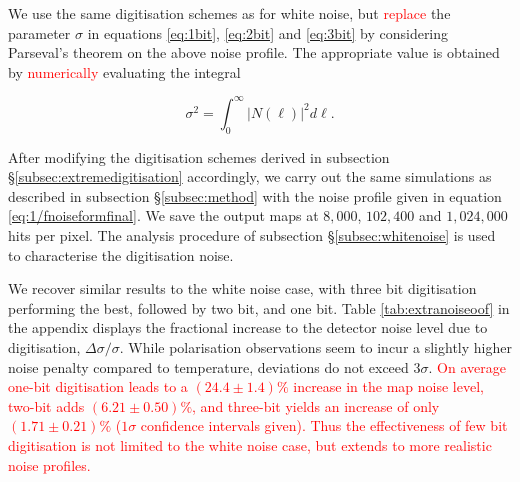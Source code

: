 \documentclass[apj]{emulateapj}
\newcommand{\changed}[1]{\textcolor{Red}{#1}}
\begin{document}
We use the same digitisation schemes as for white noise, but \changed{replace} the parameter $\sigma$ in equations \ref{eq:1bit}, \ref{eq:2bit} and \ref{eq:3bit} by considering Parseval's theorem on the above noise profile. The appropriate value is obtained by \changed{numerically} evaluating the integral

\begin{equation} \label{eq:psvl1/f}
\sigma^2 = \int_0^\infty \left| N(\ell) \right|^2 d\ell.
\end{equation}

After modifying the digitisation schemes derived in subsection \S\ref{subsec:extremedigitisation} accordingly, we carry out the same simulations as described in subsection \S\ref{subsec:method} with the noise profile given in equation \ref{eq:1/fnoiseformfinal}. We save the output maps at $8,000$, $102,400$ and $1,024,000$ hits per pixel. The analysis procedure of subsection \S\ref{subsec:whitenoise} is used to characterise the digitisation noise.


We recover similar results to the white noise case, with three bit digitisation performing the best, followed by two bit, and one bit. Table \ref{tab:extranoiseoof} in the appendix displays the fractional increase to the detector noise level due to digitisation, $\Delta \sigma / \sigma$. While polarisation observations seem to incur a slightly higher noise penalty compared to temperature, deviations do not exceed $3\sigma$. \changed{On average one-bit digitisation leads to a $(24.4\pm 1.4)\%$ increase in the map noise level, two-bit adds $(6.21\pm0.50)\%$, and three-bit yields an increase of only $(1.71\pm0.21)\%$ ($1\sigma$ confidence intervals given). Thus the effectiveness of few bit digitisation is not limited to the white noise case, but \changed{extends} to more realistic noise profiles.}
\end{document}
